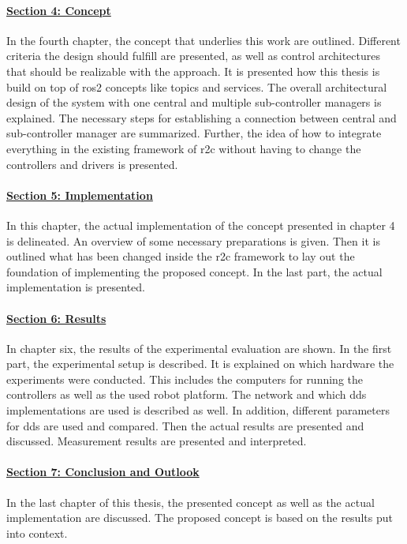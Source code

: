 \paragraph{\hyperref[sec:concept]{Section 4: Concept}}
In the fourth chapter, the concept that underlies this work are outlined. Different criteria the design should fulfill are presented, as well as control architectures that should be realizable with the approach. It is presented how this thesis is build on top of \gls{ros2} concepts like \glspl{topic} and \glspl{service}. The overall architectural design of the system with one central and multiple sub-controller managers is explained. The necessary steps for establishing a connection between central and sub-controller manager are summarized. Further, the idea of how to integrate everything in the existing framework of \gls{r2c} without having to change the controllers and drivers is presented.

\paragraph{\hyperref[sec:implementation]{Section 5: Implementation}}
In this chapter, the actual implementation of the concept presented in chapter 4 is delineated. An overview of some necessary preparations is given. Then it is outlined what has been changed inside the \gls{r2c} framework to lay out the foundation of implementing the proposed concept. In the last part, the actual implementation is presented.

\paragraph{\hyperref[sec:results]{Section 6: Results}}
In chapter six, the results of the experimental evaluation are shown. In the first part, the experimental setup is described. It is explained on which hardware the experiments were conducted. This includes the computers for running the controllers as well as the used robot platform. The network and which \gls{dds} implementations are used is described as well. In addition, different parameters for \gls{dds} are used and compared. Then the actual results are presented and discussed. Measurement results are presented and interpreted.

\paragraph{\hyperref[sec:conclusion_and_outlook]{Section 7: Conclusion and Outlook}}
In the last chapter of this thesis, the presented concept as well as the actual implementation are discussed. The proposed concept is based on the results put into context. 

